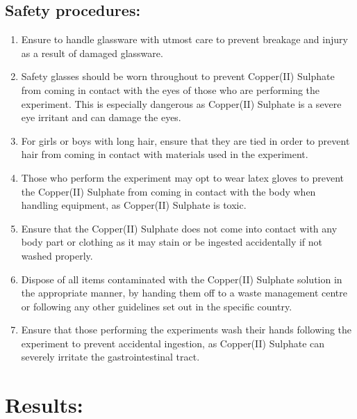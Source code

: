 \documentclass[11pt, a4]{article}
\begin{document}
		\subsection{Safety procedures:}
			\begin{enumerate}
				\item Ensure to handle glassware with utmost care to prevent breakage and injury as a result of damaged glassware.
				
				\item Safety glasses should be worn throughout to prevent Copper(II) Sulphate from coming in contact with the eyes of those who are performing the experiment. This is especially dangerous as Copper(II) Sulphate is a severe eye irritant and can damage the eyes.
				
				\item For girls or boys with long hair, ensure that they are tied in order to prevent hair from coming in contact with materials used in the experiment.
				
				\item Those who perform the experiment may opt to wear latex gloves to prevent the Copper(II) Sulphate from coming in contact with the body when handling equipment, as Copper(II) Sulphate is toxic.
										
				\item Ensure that the Copper(II) Sulphate does not come into contact with any body part or clothing as it may stain or be ingested accidentally if not washed properly.
				
				\item Dispose of all items contaminated with the Copper(II) Sulphate solution in the appropriate manner, by handing them off to a waste management centre or following any other guidelines set out in the specific country.

				\item Ensure that those performing the experiments wash their hands following the experiment to prevent accidental ingestion, as Copper(II) Sulphate can severely irritate the gastrointestinal tract.
			\end{enumerate}
			

	\section{Results:}
\end{document}
